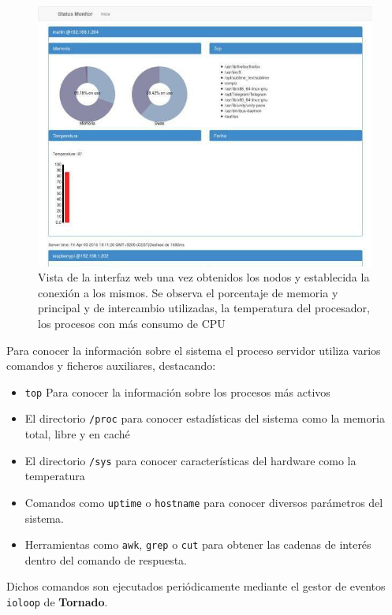 \begin{figure}[H]
\centering
\includegraphics[width=\textwidth]{Chapter3/Figures/statusmonitor}
\caption{Vista de la interfaz web una vez obtenidos los nodos y establecida la conexión a los mismos. Se observa el porcentaje de memoria y principal y de intercambio utilizadas, la temperatura del procesador, los procesos con más consumo de CPU} %
\label{fig:vista_statusmonitor}
\end{figure}

Para conocer la información sobre el sistema el proceso servidor utiliza varios comandos y ficheros auxiliares, destacando:

\begin{itemize}
\item \texttt{top} Para conocer la información sobre los procesos más activos
\item El directorio \texttt{/proc} para conocer estadísticas del sistema como la memoria total, libre y en caché
\item El directorio \texttt{/sys} para conocer características del hardware como la temperatura
\item Comandos como \texttt{uptime} o \texttt{hostname} para conocer diversos parámetros del sistema.
\item Herramientas como \texttt{awk}, \texttt{grep} o \texttt{cut} para obtener las cadenas de interés dentro del comando de respuesta.
\end{itemize}

Dichos comandos son ejecutados periódicamente mediante el gestor de eventos \texttt{ioloop} de \textbf{Tornado}.

